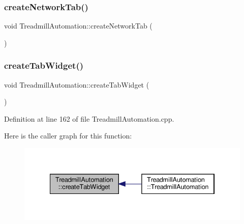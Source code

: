 \subsubsection{\texorpdfstring{create\+Network\+Tab()}{createNetworkTab()}}
{\footnotesize\ttfamily void Treadmill\+Automation\+::create\+Network\+Tab (\begin{DoxyParamCaption}{ }\end{DoxyParamCaption})}

\mbox{\label{class_treadmill_automation_abd813a9352232e33a223e530791c50f3}} 
\subsubsection{\texorpdfstring{create\+Tab\+Widget()}{createTabWidget()}}
{\footnotesize\ttfamily void Treadmill\+Automation\+::create\+Tab\+Widget (\begin{DoxyParamCaption}{ }\end{DoxyParamCaption})}



Definition at line 162 of file Treadmill\+Automation.\+cpp.

Here is the caller graph for this function\+:
\nopagebreak
\begin{figure}[H]
\begin{center}
\leavevmode
\includegraphics[width=334pt]{class_treadmill_automation_abd813a9352232e33a223e530791c50f3_icgraph}
\end{center}
\end{figure}
\mbox{\label{class_treadmill_automation_adacc698118c599e34ae1c532ee4c69d8}} 
